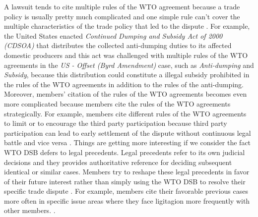 A lawsuit tends to cite multiple rules of the WTO agreement because a trade policy is usually pretty much complicated
and one simple rule can't cover the multiple characteristics of the trade policy that led to the dispute \citep{palmeter2004dispute}.
For example, the United States enacted \textit{Continued Dumping and Subsidy Act of 2000 (CDSOA)} that distributes
the collected anti-dumping duties to its affected domestic producers and this act was challenged with multiple rules of the WTO agreements in the \textit{US - Offset (Byrd Amendment)} case,
such as \textit{Anti-dumping} and \textit{Subsidy}, because
this distribution could constitute a illegal subsidy prohibited
in the rules of the WTO agreements in addition to the rules of the anti-dumping. %
Moreover, members' citation of the rules of the WTO agreements becomes even more complicated because members cite the
rules of the WTO agreements strategically. For example,
members cite different rules of the WTO agreements to limit or to encourage
the third party participation because third party
participation can lead to early settlement of the dispute without continuous
legal battle and vice versa  \cite{who_gets}.
Things are getting more interesting
if we consider the fact WTO DSB defers to legal precedents.
Legal precedents refer to its own judicial decisions
and they provides authoritative reference
for deciding subsequent identical or similar cases.
Members try to reshape these legal precedents
in favor of their future interest rather than
simply using the WTO DSB to resolve their specific trade
dispute \citep{pelc}. For example,
members cite their
favorable previous cases more often in specific
issue areas where they face ligitagion more frequently with other members.
\citep{latent}.
 

